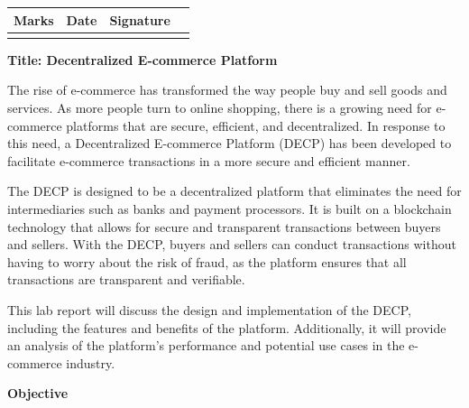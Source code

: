 \documentclass[a4paper,11pt]{article}
\begin{document}
\begin{center}
\begin{center}
\begin{table}[h]
\centering
\begin{tabular}{|p{4cm}|p{6cm}|p{4cm}|} \hline
\textbf{Marks} & \textbf{Date}& \textbf{Signature} \\ \hline  
                &              &                     
                   &              &                     \\ \hline


\end{tabular}
\end{table}



\end{center}

\newpage

\begin{center}
 \textbf{\Large Title: Decentralized E-commerce Platform}   


 \vspace{1cm}
The rise of e-commerce has transformed the way people buy and sell goods and services. As more people turn to online shopping, there is a growing need for e-commerce platforms that are secure, efficient, and decentralized. In response to this need, a Decentralized E-commerce Platform (DECP) has been developed to facilitate e-commerce transactions in a more secure and efficient manner.

The DECP is designed to be a decentralized platform that eliminates the need for intermediaries such as banks and payment processors. It is built on a blockchain technology that allows for secure and transparent transactions between buyers and sellers. With the DECP, buyers and sellers can conduct transactions without having to worry about the risk of fraud, as the platform ensures that all transactions are transparent and verifiable.

This lab report will discuss the design and implementation of the DECP, including the features and benefits of the platform. Additionally, it will provide an analysis of the platform's performance and potential use cases in the e-commerce industry.
\end{center}





    

\vspace{1cm}

\begin{center}
 \textbf{\Large Objective}   



\end{center}
\end{center}
\end{document}
